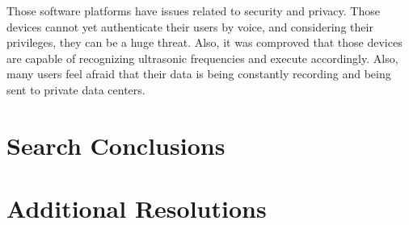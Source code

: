 Those software platforms have issues related to security and privacy. Those devices cannot yet authenticate their users by voice, and considering their privileges, they can be a huge threat. Also, it was comproved that those devices are capable of recognizing ultrasonic frequencies and execute accordingly. Also, many users feel afraid that their data is being constantly recording and being sent to private data centers.

\subsection{\RQIII}

\section{Search Conclusions}

\subsection{\RQI}

\subsection{\RQII}

\subsection{\RQIII}

\section{Additional Resolutions}




